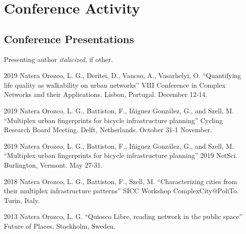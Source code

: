 \documentclass{academiccv}
\begin{document}
\section*{Conference Activity}


\subsection*{Conference Presentations}
Presenting author \textit{italicized}, if other.\bigskip
\begin{tablist}
	\item[2019] \tab Natera Orozco, L. G., Deritei, D., Vancso, A., Vasarhelyi, O. \enquote{Quantifying life quality as walkability on urban networks} VIII Conference in Complex Networks and their Applications. Lisbon, Portugal. December 12-14.
	\item[2019] \tab Natera Orozco, L. G., Battiston, F., Iñiguez González, G., and Szell, M. \enquote{Multiplex urban fingerprints for bicycle infrastructure planning} Cycling Research Board Meeting. Delft, Netherlands. October 31-1 November.
	\item[2019] \tab Natera Orozco, L. G., Battiston, F., Iñiguez González, G., and Szell, M. \enquote{Multiplex urban fingerprints for bicycle infrastructure planning} 2019 NetSci. Burlington, Vermont. May 27-31.
	\item[2018] \tab Natera Orozco, L. G., Battiston, F., Szell, M. \enquote{Characterizing cities from their multiplex infrastructure patterns} SICC Workshop ComplexCity@PoliTo. Turin, Italy.
	\item[2013] \tab Natera Orozco, L. G. \enquote{Quiosco Libre, reading network in the public space} Future of Places. Stockholm, Sweden.
\end{tablist}
\end{document}
